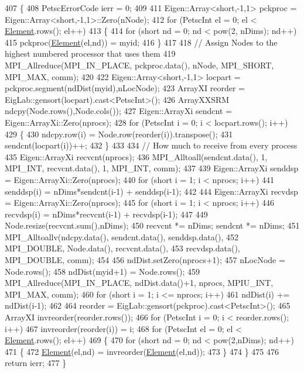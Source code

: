 \begin{DoxyCode}
407 \{
408     PetscErrorCode ierr = 0;
409 
411     Eigen::Array<short,-1,1> pckproc = Eigen::Array<short,-1,1>::Zero(nNode);
412     \textcolor{keywordflow}{for} (PetscInt el = 0; el < \mbox{\hyperlink{class_element}{Element}}.rows(); el++)
413     \{
414         \textcolor{keywordflow}{for} (\textcolor{keywordtype}{short} nd = 0; nd < pow(2, nDims); nd++)
415             pckproc(\mbox{\hyperlink{class_element}{Element}}(el,nd)) = myid;
416     \}
417 
418     \textcolor{comment}{// Assign Nodes to the highest numbered processor that uses them}
419     MPI\_Allreduce(MPI\_IN\_PLACE, pckproc.data(), nNode, MPI\_SHORT, MPI\_MAX, comm);
420 
422     Eigen::Array<short,-1,1> locpart = pckproc.segment(ndDist(myid),nLocNode);
423     ArrayXI reorder = EigLab::gensort(locpart).cast<PetscInt>();
426     ArrayXXSRM ndcpy(Node.rows(),Node.cols());
427     Eigen::ArrayXi sendcnt = Eigen::ArrayXi::Zero(nprocs);
428     \textcolor{keywordflow}{for} (PetscInt i = 0; i < locpart.rows(); i++)
429     \{
430         ndcpy.row(i) = Node.row(reorder(i)).transpose();
431         sendcnt(locpart(i))++;
432     \}
433 
434     \textcolor{comment}{// How much to receive from every process}
435     Eigen::ArrayXi recvcnt(nprocs);
436     MPI\_Alltoall(sendcnt.data(), 1, MPI\_INT, recvcnt.data(), 1, MPI\_INT, comm);
437 
439     Eigen::ArrayXi senddsp = Eigen::ArrayXi::Zero(nprocs);
440     \textcolor{keywordflow}{for} (\textcolor{keywordtype}{short} i = 1; i < nprocs; i++)
441         senddsp(i) = nDims*sendcnt(i-1) + senddsp(i-1);
442 
444     Eigen::ArrayXi recvdsp = Eigen::ArrayXi::Zero(nprocs);
445     \textcolor{keywordflow}{for} (\textcolor{keywordtype}{short} i = 1; i < nprocs; i++)
446         recvdsp(i) = nDims*recvcnt(i-1) + recvdsp(i-1);
447 
449     Node.resize(recvcnt.sum(),nDims);
450     recvcnt *= nDims; sendcnt *= nDims;
451     MPI\_Alltoallv(ndcpy.data(), sendcnt.data(), senddsp.data(),
452                   MPI\_DOUBLE, Node.data(), recvcnt.data(),
453                   recvdsp.data(), MPI\_DOUBLE, comm);
454 
456     ndDist.setZero(nprocs+1);
457     nLocNode = Node.rows();
458     ndDist(myid+1) = Node.rows();
459     MPI\_Allreduce(MPI\_IN\_PLACE, ndDist.data()+1, nprocs, MPIU\_INT, MPI\_MAX, comm);
460     \textcolor{keywordflow}{for} (\textcolor{keywordtype}{short} i = 1; i <= nprocs; i++)
461         ndDist(i) += ndDist(i-1);
462 
464     reorder = EigLab::gensort(pckproc).cast<PetscInt>();
465     ArrayXI invreorder(reorder.rows());
466     \textcolor{keywordflow}{for} (PetscInt i = 0; i < reorder.rows(); i++)
467       invreorder(reorder(i)) = i;
468     \textcolor{keywordflow}{for} (PetscInt el = 0; el < \mbox{\hyperlink{class_element}{Element}}.rows(); el++)
469     \{
470         \textcolor{keywordflow}{for} (\textcolor{keywordtype}{short} nd = 0; nd < pow(2,nDims); nd++)
471         \{
472             \mbox{\hyperlink{class_element}{Element}}(el,nd) = invreorder(\mbox{\hyperlink{class_element}{Element}}(el,nd));
473         \}
474     \}
475 
476     \textcolor{keywordflow}{return} ierr;
477 \}
\end{DoxyCode}
\mbox{\label{class_mesh_a69a626f34e07b13615847d2d3028f20b}} 
